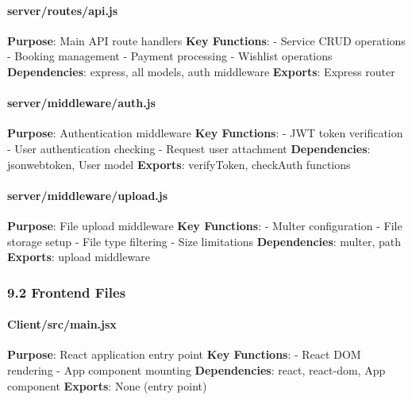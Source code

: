 \documentclass[12pt,a4paper]{article}
\begin{document}
\hypertarget{serverroutesapi.js}{%
\paragraph{server/routes/api.js}\label{serverroutesapi.js}}

\textbf{Purpose}: Main API route handlers \textbf{Key Functions}: -
Service CRUD operations - Booking management - Payment processing -
Wishlist operations \textbf{Dependencies}: express, all models, auth
middleware \textbf{Exports}: Express router

\hypertarget{servermiddlewareauth.js}{%
\paragraph{server/middleware/auth.js}\label{servermiddlewareauth.js}}

\textbf{Purpose}: Authentication middleware \textbf{Key Functions}: -
JWT token verification - User authentication checking - Request user
attachment \textbf{Dependencies}: jsonwebtoken, User model
\textbf{Exports}: verifyToken, checkAuth functions

\hypertarget{servermiddlewareupload.js}{%
\paragraph{server/middleware/upload.js}\label{servermiddlewareupload.js}}

\textbf{Purpose}: File upload middleware \textbf{Key Functions}: -
Multer configuration - File storage setup - File type filtering - Size
limitations \textbf{Dependencies}: multer, path \textbf{Exports}: upload
middleware

\hypertarget{frontend-files}{%
\subsubsection{9.2 Frontend Files}\label{frontend-files}}

\hypertarget{clientsrcmain.jsx}{%
\paragraph{Client/src/main.jsx}\label{clientsrcmain.jsx}}

\textbf{Purpose}: React application entry point \textbf{Key Functions}:
- React DOM rendering - App component mounting \textbf{Dependencies}:
react, react-dom, App component \textbf{Exports}: None (entry point)
\end{document}
